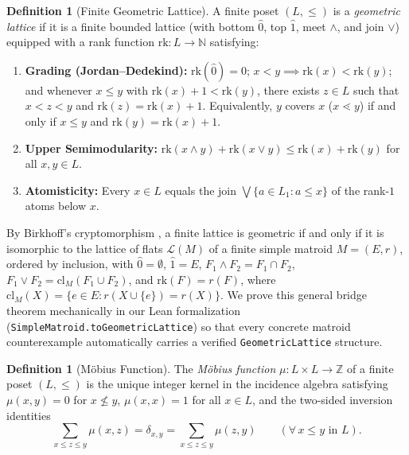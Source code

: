 \documentclass[11pt]{article}
\theoremstyle{definition}
\newtheorem{definition}[theorem]{Definition}
\theoremstyle{remark}
\newcommand{\rk}{\mathrm{rk}}
\newcommand{\cl}{\mathrm{cl}}
\begin{document}
\begin{definition}[Finite Geometric Lattice]\label{def:geom-lattice}
A finite poset $(L, \le)$ is a \emph{geometric lattice} if it is a finite bounded lattice (with bottom $\hat{0}$, top $\hat{1}$, meet $\wedge$, and join $\vee$) equipped with a rank function $\rk : L \to \mathbb{N}$ satisfying:
\begin{enumerate}
\item[(a)] \textbf{Grading (Jordan--Dedekind):} $\rk(\hat{0}) = 0$; $x < y \implies \rk(x) < \rk(y)$; and whenever $x \le y$ with $\rk(x) + 1 < \rk(y)$, there exists $z \in L$ such that $x < z < y$ and $\rk(z) = \rk(x) + 1$. Equivalently, $y$ covers $x$ ($x \lessdot y$) if and only if $x \le y$ and $\rk(y) = \rk(x) + 1$.
\item[(b)] \textbf{Upper Semimodularity:} $\rk(x \wedge y) + \rk(x \vee y) \le \rk(x) + \rk(y)$ for all $x, y \in L$.
\item[(c)] \textbf{Atomisticity:} Every $x \in L$ equals the join $\bigvee \{a \in L_1 : a \le x\}$ of the rank-$1$ atoms below $x$.
\end{enumerate}
\end{definition}

By Birkhoff's cryptomorphism \cite[Theorem~1.7.5]{Oxley2011}, a finite lattice is geometric if and only if it is isomorphic to the lattice of flats $\mathcal{L}(M)$ of a finite simple matroid $M = (E, r)$, ordered by inclusion, with $\hat{0} = \emptyset$, $\hat{1} = E$, $F_1 \wedge F_2 = F_1 \cap F_2$, $F_1 \vee F_2 = \cl_M(F_1 \cup F_2)$, and $\rk(F) = r(F)$, where $\cl_M(X) = \{e \in E : r(X \cup \{e\}) = r(X)\}$. We prove this general bridge theorem mechanically in our Lean formalization (\texttt{SimpleMatroid.toGeometricLattice}) so that every concrete matroid counterexample automatically carries a verified \texttt{GeometricLattice} structure.

\begin{definition}[M\"obius Function]\label{def:mobius}
The \emph{M\"obius function} $\mu : L \times L \to \mathbb{Z}$ of a finite poset $(L, \le)$ is the unique integer kernel in the incidence algebra satisfying $\mu(x, y) = 0$ for $x \not\le y$, $\mu(x, x) = 1$ for all $x \in L$, and the two-sided inversion identities
\begin{equation}\label{eq:mobius-inversion}
  \sum_{x \le z \le y} \mu(x, z) = \delta_{x, y} = \sum_{x \le z \le y} \mu(z, y) \qquad (\forall\, x \le y \text{ in } L).
\end{equation}
\end{definition}
\end{document}
